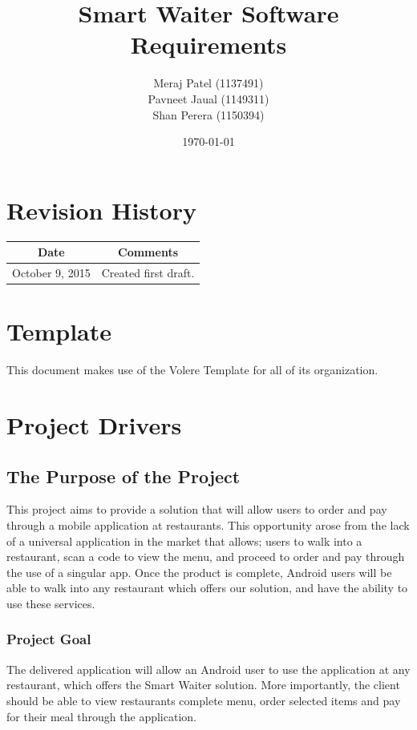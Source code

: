 \documentclass[12pt, titlepage]{article}
\begin{document}
\title{Smart Waiter Software Requirements} 
\author{Meraj Patel (1137491)\\ Pavneet Jaual (1149311)\\ Shan Perera (1150394)}
\date{\today}
\maketitle

\tableofcontents 

\listoffigures

\listoftables

\section*{Revision History}
\begin{tabular}{|c|c|}
\hline
\textbf{Date}  & \textbf{Comments} \\ \hline
October 9, 2015 & Created first draft. \\ 
\hline
\end{tabular}

\section*{Template}
This document makes use of the Volere Template for all of its organization.


\section{Project Drivers}

\subsection{The Purpose of the Project}
This project aims to provide a solution that will allow users to order and pay through a mobile application at restaurants. This opportunity arose from the lack of a universal application in the market that allows; users to walk into a restaurant, scan a code to view the menu, and proceed to order and pay through the use of a singular app. Once the product is complete, Android users will be able to walk into any restaurant which offers our solution, and have the ability to use these services.
\subsubsection{Project Goal}
The delivered application will allow an Android user to use the application at any restaurant, which offers the Smart Waiter solution.  More importantly, the client should be able to view restaurants complete menu, order selected items and pay for their meal through the application. 
\end{document}

